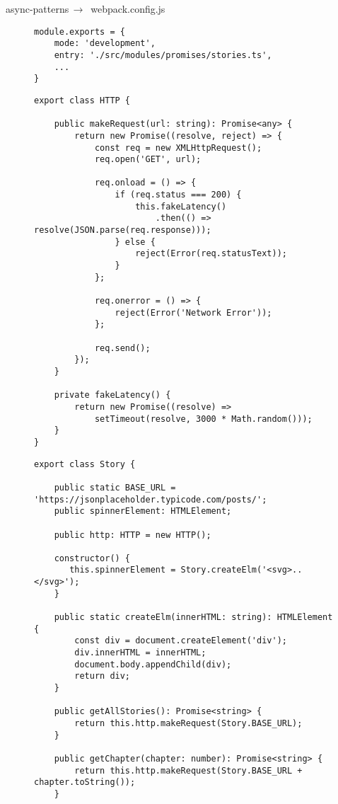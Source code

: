  \begin{center}
     async-patterns$\,\to\,$ webpack.config.js
 \end{center}

\begin{figure}[H]
\begin{lstlisting}[basicstyle=\small]
module.exports = {
    mode: 'development',
    entry: './src/modules/promises/stories.ts',
    ...
}
\end{lstlisting}
\end{figure}


\begin{figure}[H]
\begin{lstlisting}[basicstyle=\small]
export class HTTP {

    public makeRequest(url: string): Promise<any> {
        return new Promise((resolve, reject) => {
            const req = new XMLHttpRequest();
            req.open('GET', url);

            req.onload = () => {
                if (req.status === 200) {
                    this.fakeLatency()
                        .then(() => resolve(JSON.parse(req.response)));
                } else {
                    reject(Error(req.statusText));
                }
            };

            req.onerror = () => {
                reject(Error('Network Error'));
            };

            req.send();
        });
    }

    private fakeLatency() {
        return new Promise((resolve) =>
            setTimeout(resolve, 3000 * Math.random()));
    }
}
\end{lstlisting}
\end{figure}

\begin{figure}[H]
\begin{lstlisting}[basicstyle=\small]
export class Story {

    public static BASE_URL = 'https://jsonplaceholder.typicode.com/posts/';
    public spinnerElement: HTMLElement;

    public http: HTTP = new HTTP();

    constructor() {
       this.spinnerElement = Story.createElm('<svg>..</svg>');
    }

    public static createElm(innerHTML: string): HTMLElement {
        const div = document.createElement('div');
        div.innerHTML = innerHTML;
        document.body.appendChild(div);
        return div;
    }
    
    public getAllStories(): Promise<string> {
        return this.http.makeRequest(Story.BASE_URL);
    }

    public getChapter(chapter: number): Promise<string> {
        return this.http.makeRequest(Story.BASE_URL + chapter.toString());
    }
\end{lstlisting}
\end{figure}

